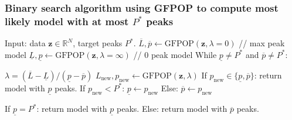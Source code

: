 \documentclass{beamer}
\newcommand{\RR}{\mathbb R}
\begin{document}
\begin{frame}
  \frametitle{Binary search algorithm using GFPOP to compute most
    likely model with at most $P^*$ peaks}
  \begin{algorithmic}[1]
  \STATE Input: data $\mathbf z\in\RR^N$, target peaks $P^*$.
  \STATE $\overline L,\overline p \gets \text{GFPOP}(\mathbf z, \lambda=0)$ // max peak model
  \STATE $\underline L,\underline p \gets \text{GFPOP}(\mathbf z, \lambda=\infty)$ // 0 peak model
  \STATE While $\underline p\neq P^*$ and $\overline p\neq P^*$:
  \begin{ALC@g}
    \STATE $\lambda=(\overline L-\underline L)/(\underline p-\overline p)$
    \STATE $L_{\text{new}},p_{\text{new}}\gets\text{GFPOP}(\mathbf z, \lambda)$
    \STATE If $p_{\text{new}}\in\{\underline p, \overline p\}$: return model with $\underline p$ peaks.
    \STATE If $p_{\text{new}} < P^*$: $\underline p\gets p_{\text{new}}$
    \STATE Else: $\overline p\gets p_{\text{new}}$
  \end{ALC@g}
  \STATE If $\underline p=P^*$: return model with $\underline p$ peaks.
  \STATE Else: return model with $\overline p$ peaks.
  \end{algorithmic}
\end{frame}
\end{document}
